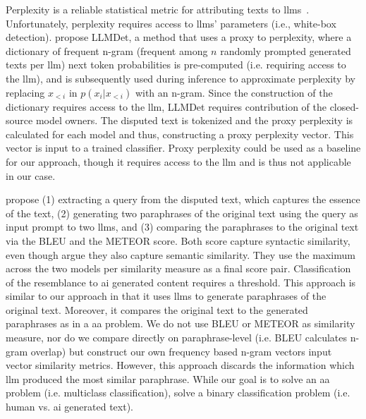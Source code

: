 Perplexity is a reliable statistical metric for attributing texts to \acp{llm}~\citep{zhang_llmdet_2023}.
Unfortunately, perplexity requires access to \acp{llm}' parameters (i.e., white-box detection).
\citet{wu_llmdet_2023} propose LLMDet, a method that uses a proxy to perplexity, 
where a dictionary of frequent n-gram (frequent among $n$ randomly prompted generated texts per \ac{llm}) 
next token probabilities is pre-computed (i.e. requiring access to the \ac{llm}), 
and is subsequently used during inference to approximate perplexity by replacing $x_{<i}$ in $p(x_i | x_{<i})$ with an n-gram.
Since the construction of the dictionary requires access to the \ac{llm}, LLMDet requires contribution of the closed-source model owners.
The disputed text is tokenized and the proxy perplexity is calculated for each model and thus, constructing a proxy perplexity vector.
This vector is input to a trained classifier.
Proxy perplexity could be used as a baseline for our approach, though it requires access to the \ac{llm} and is thus not applicable in our case.

\citet{baradia_mirror_2025} propose (1) extracting a query from the disputed text, which captures the essence of the text, 
(2) generating two paraphrases of the original text using the query as input prompt to two \acp{llm}, 
and (3) comparing the paraphrases to the original text via the BLEU and the METEOR score.
Both score capture syntactic similarity, even though \citet{baradia_mirror_2025} argue they also capture semantic similarity.
They use the maximum across the two models per similarity measure as a final score pair.
Classification of the resemblance to \ac{ai} generated content requires a threshold.
This approach is similar to our approach in that it uses \acp{llm} to generate paraphrases of the original text.
Moreover, it compares the original text to the generated paraphrases as in a \ac{aa} problem. %
We do not use BLEU or METEOR as similarity measure, nor do we compare directly on paraphrase-level (i.e. BLEU calculates n-gram overlap) 
but construct our own frequency based n-gram vectors input vector similarity metrics.
However, this approach discards the information which \ac{llm} produced the most similar paraphrase. 
While our goal is to solve an \ac{aa} problem (i.e. multiclass classification), 
\citet{baradia_mirror_2025} solve a binary classification problem (i.e. human vs. \ac{ai} generated text).